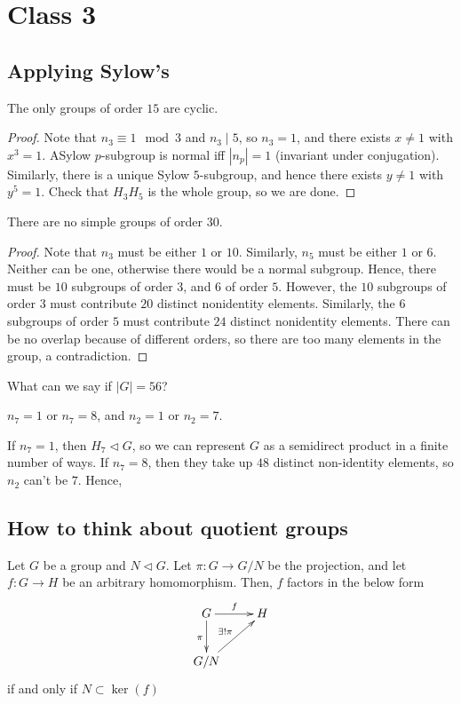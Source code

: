\documentclass[12pt]{scrartcl}
\begin{document}
\section{Class 3}
\subsection{Applying Sylow's}
\begin{corollary}
The only groups of order $15$ are cyclic.
\end{corollary}
\begin{proof}
Note that $n_3 \equiv 1 \mod 3$ and $n_3 \mid 5$, so $n_3 = 1$, and there exists $x \neq 1$ with $x^3 = 1$.
ASylow $p$-subgroup is normal iff $|n_p| =1$ (invariant under conjugation).
Similarly, there is a unique Sylow $5$-subgroup, and hence there exists $y \neq 1$ with $y^5 = 1$.
Check that $H_3H_5$ is the whole group, so we are done. 
\end{proof}

\begin{corollary}
There are no simple groups of order $30$. 
\end{corollary}
\begin{proof}
Note that $n_3$ must be either $1$ or $10$.
Similarly, $n_5$ must be either $1$ or $6$.
Neither can be one, otherwise there would be a normal subgroup. 
Hence, there must be $10$ subgroups of order $3$, and $6$ of order $5$.
However, the $10$ subgroups of order $3$ must contribute $20$ distinct nonidentity elements.
Similarly, the $6$ subgroups of order $5$ must contribute $24$ distinct nonidentity elements.
There can be no overlap because of different orders, so there are too many elements in the group, a contradiction.
\end{proof}

\begin{corollary}
What can we say if $|G| = 56$?
\end{corollary}

$n_7 = 1$ or $n_7 = 8$, and $n_2 = 1$ or $n_2 = 7$.

If $n_7 = 1$, then $H_7 \triangleleft G$, so we can represent $G$ as a semidirect product in a finite number of ways.
If $n_7 = 8$, then they take up $48$ distinct non-identity elements, so $n_2$ can't be $7$. 
Hence, 
\subsection{How to think about quotient groups}
Let $G$ be a group and $N \triangleleft G$. 
Let $\pi: G \to G/N$ be the projection, and let $f: G \to H$ be an arbitrary homomorphism.
Then, $f$ factors in the below form
\[
\xymatrix{
	G \ar[d]_{\pi}\ar[r]^{f} & H \\
	G/N \ar[ur]^{\exists ! \pi} & \\
}
\] 
if and only if $N \subset \ker(f)$ 
\end{document}
